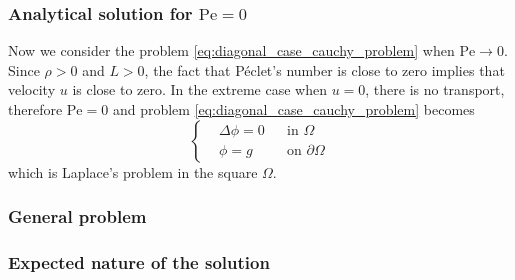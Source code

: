 \subsubsection{Analytical solution for \texorpdfstring{$\mathrm{Pe} = 0$}{zero Péclet's number}}

Now we consider the problem \eqref{eq:diagonal_case_cauchy_problem} when $\mathrm{Pe} \to 0$. Since $\rho > 0$ and $L > 0$, the fact that Péclet's number is close to zero implies that velocity $u$ is close to zero. In the extreme case when $u = 0$, there is no transport, therefore $\mathrm{Pe} = 0$ and problem \eqref{eq:diagonal_case_cauchy_problem} becomes
\begin{equation} \label{eq:diagonal_case_cauchy_problem_zero_peclet}
	\left\{
	\begin{aligned}
		&\Delta \phi = 0 &
		&\text{in } \Omega \\
		&\phi = g &
		&\text{on } \partial \Omega
	\end{aligned}
	\right.
\end{equation}
which is Laplace's problem in the square $\Omega$. 

\subsubsection{General problem}

\subsubsection{Expected nature of the solution}